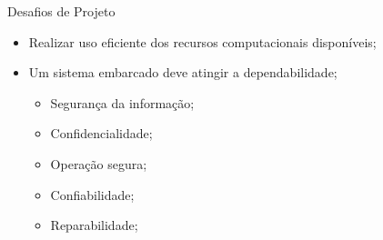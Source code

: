 \begin{frame}{Desafios de Projeto}

    \begin{itemize}
    
        \item Realizar uso eficiente dos recursos computacionais disponíveis;
        
        
        \item Um sistema embarcado deve atingir a dependabilidade;
        
        \begin{itemize}
            \item Segurança da informação;
            \item Confidencialidade;
            \item Operação segura;
            \item Confiabilidade;
            \item Reparabilidade;
        \end{itemize}
        
        
        
        
    \end{itemize}
    
    
    
    

    
\end{frame}







